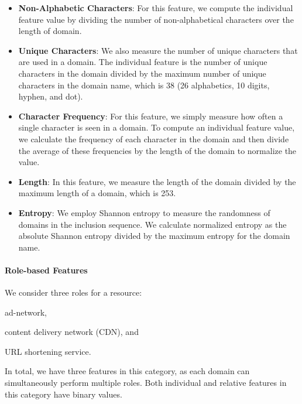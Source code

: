 \begin{itemize}

\item \textbf{Non-Alphabetic Characters}: For this feature, we compute the
individual feature value by dividing the number of non-alphabetical characters
over the length of domain.

\item \textbf{Unique Characters}: We also measure the number of unique
characters that are used in a domain. The individual feature is the number of
unique characters in the domain divided by the maximum number of unique
characters in the domain name, which is 38 (26 alphabetics, 10 digits, hyphen,
and dot).

\item \textbf{Character Frequency}: For this feature, we simply measure how
often a single character is seen in a domain. To compute an individual feature
value, we calculate the frequency of each character in the domain and then
divide the average of these frequencies by the length of the domain to normalize
the value.

\item \textbf{Length}: In this feature, we measure the length of the domain
divided by the maximum length of a domain, which is 253.

\item \textbf{Entropy}: We employ Shannon entropy to measure the randomness of
domains in the inclusion sequence. We calculate normalized entropy as the
absolute Shannon entropy divided by the maximum entropy for the domain name.

\end{itemize}

\paragraph{Role-based Features}

We consider three roles for a resource:
\begin{inparaenum}
     \item ad-network,
     \item content delivery network (CDN), and
     \item URL shortening service.
\end{inparaenum}
In total, we have three features in this category, as each domain can
simultaneously perform multiple roles. Both individual and relative features in
this category have binary values.
